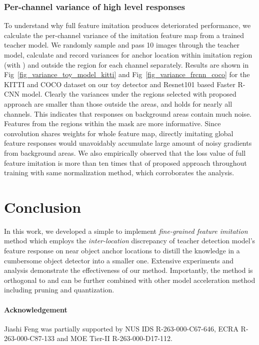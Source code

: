 \documentclass[10pt,twocolumn,letterpaper]{article}
\begin{document}
\vspace{-3mm}
\subsubsection{Per-channel variance of high level responses}
\label{per_channel_variance} 
To understand why full feature imitation produces deteriorated performance, we calculate the per-channel variance of the imitation feature map from a trained teacher model. We randomly sample and pass 10 images through the teacher model, calculate and record variances for anchor location within imitation region (with ) and outside the region for each channel separately. Results are shown in Fig~\ref{fig_variance_toy_model_kitti} and Fig~\ref{fig_variance_frcnn_coco} for the KITTI and COCO dataset on our  toy detector and Resnet101 based Faster R-CNN model. Clearly the variances under the regions selected with proposed approach are smaller than those outside the areas, and holds for nearly all channels. This indicates that responses on background areas contain much noise. Features from the regions within the mask  are  more informative. Since convolution shares weights for whole feature map, directly imitating global feature responses would unavoidably accumulate large amount of noisy gradients from background areas.  We also empirically observed that the loss value of full feature imitation is more than ten times that of proposed approach throughout training with same normalization method, which corroborates the analysis. 


\section{Conclusion}
In this work, we developed a simple to implement \emph{fine-grained feature imitation} method which employs the \emph{inter-location} discrepancy of teacher detection model's feature response on near object anchor locations to distill the knowledge in a cumbersome object detector into a smaller one. Extensive experiments and analysis demonstrate the effectiveness of our method. Importantly, the method is orthogonal to and can be further combined with other model acceleration method including pruning and quantization.
\vspace{-10pt}
\paragraph{Acknowledgement}							
Jiashi Feng was partially supported by NUS IDS R-263-000-C67-646,  ECRA R-263-000-C87-133 and MOE Tier-II R-263-000-D17-112.					
{\small


}
\end{document}
